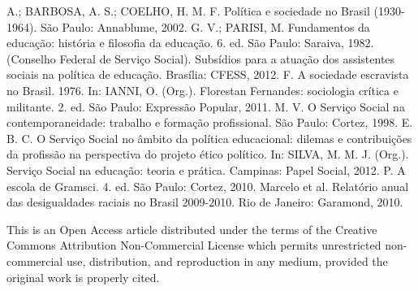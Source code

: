 \begin{biblio}
 A.; BARBOSA, A. S.; COELHO, H. M. F. Política e sociedade no
 Brasil (1930-1964). São Paulo: Annablume, 2002.
 G. V.; PARISI, M. Fundamentos da educação: história e filosofia
 da educação. 6. ed. São Paulo: Saraiva, 1982.
(Conselho Federal de Serviço Social). Subsídios para a atuação dos
 assistentes sociais na política de educação. Brasília: CFESS, 2012.
 F. A sociedade escravista no Brasil. 1976. In: IANNI, O.
 (Org.). Florestan Fernandes: sociologia crítica e militante. 2. ed. São Paulo:
 Expressão Popular, 2011.
 M. V. O Serviço Social na contemporaneidade: trabalho e
 formação profissional. São Paulo: Cortez, 1998.
 E. B. C. O Serviço Social no âmbito da política educacional:
 dilemas e contribuições da profissão na perspectiva do projeto ético político. In:
 SILVA, M. M. J. (Org.). Serviço Social na educação: teoria e prática. Campinas: Papel
 Social, 2012.
 P. A escola de Gramsci. 4. ed. São Paulo: Cortez,
 2010.
 Marcelo et al. Relatório anual das desigualdades raciais no
 Brasil 2009-2010. Rio de Janeiro: Garamond, 2010.
\end{biblio}

\medskip\par\noindent
\footnotesize{This is an Open Access article distributed under the terms of the Creative
 Commons Attribution Non-Commercial License which permits unrestricted
 non-commercial use, distribution, and reproduction in any medium, provided the
 original work is properly cited.}
